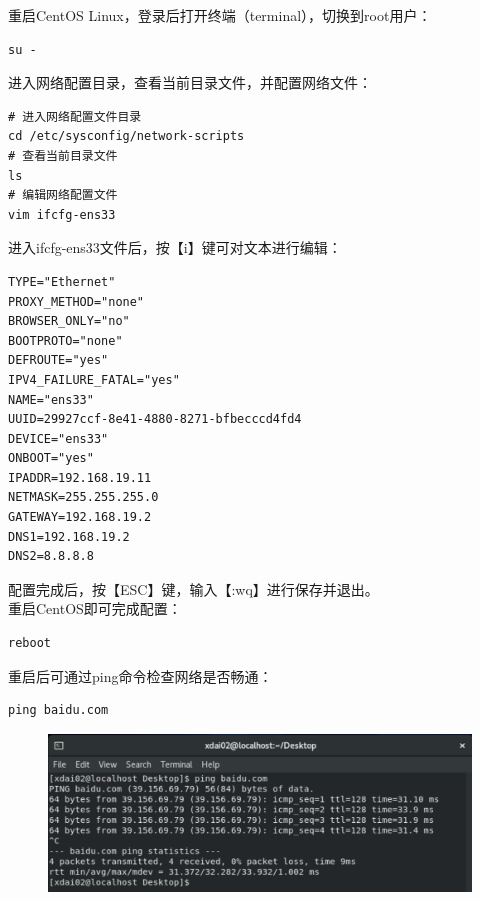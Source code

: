 \documentclass[12pt, openany, oneside]{book}
\begin{document}
重启CentOS Linux，登录后打开终端（terminal），切换到root用户：

\vspace{-0.5cm}

\begin{lstlisting}
su -
\end{lstlisting}

进入网络配置目录，查看当前目录文件，并配置网络文件：

\vspace{-0.5cm}

\begin{lstlisting}
# 进入网络配置文件目录
cd /etc/sysconfig/network-scripts
# 查看当前目录文件
ls
# 编辑网络配置文件
vim ifcfg-ens33
\end{lstlisting}

进入ifcfg-ens33文件后，按【i】键可对文本进行编辑：

\vspace{-0.5cm}

\begin{lstlisting}
TYPE="Ethernet"
PROXY_METHOD="none"
BROWSER_ONLY="no"
BOOTPROTO="none"
DEFROUTE="yes"
IPV4_FAILURE_FATAL="yes"
NAME="ens33"
UUID=29927ccf-8e41-4880-8271-bfbecccd4fd4
DEVICE="ens33"
ONBOOT="yes"
IPADDR=192.168.19.11
NETMASK=255.255.255.0
GATEWAY=192.168.19.2
DNS1=192.168.19.2
DNS2=8.8.8.8
\end{lstlisting}

配置完成后，按【ESC】键，输入【:wq】进行保存并退出。\\

重启CentOS即可完成配置：

\vspace{-0.5cm}

\begin{lstlisting}
reboot
\end{lstlisting}

重启后可通过ping命令检查网络是否畅通：

\vspace{-0.5cm}

\begin{lstlisting}
ping baidu.com
\end{lstlisting}

\begin{figure}[H]
    \centering
    \includegraphics[scale=0.6]{img/Chapter1/1-4/11.png}
\end{figure}
\end{document}
